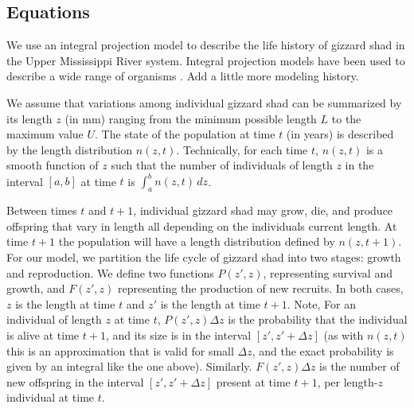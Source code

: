 \documentclass[11pt,oneside]{amsart}
\def\ds{\displaystyle}
\theoremstyle{definition}
\begin{document}
\subsection{Equations}
We use an integral projection model to describe the life history of gizzard shad in the Upper Mississippi River system.  Integral projection models have been used to describe a wide range of organisms \citep{ellner2016data, merow2014advancing, rees2014building}.  Add a little more modeling history.

We assume that variations among individual gizzard shad can be summarized by its length $z$ (in mm) ranging from the minimum possible length $L$ to the maximum value $U$.  The state of the population at time $t$ (in years) is described by the length distribution $n(z,t)$.  Technically, for each time $t$, $n(z,t)$ is a smooth function of $z$ such that the number of individuals of length $z$ in the interval $[a,b]$ at time $t$ is $\ds \int_a^b n(z,t) \, dz$. 

Between times $t$ and $t+1$, individual gizzard shad may grow, die, and produce offspring that vary in length all depending on the individuals current length. At time $t+1$ the population will have a length distribution defined by $n(z, t+1)$. For our model, we partition the life cycle of gizzard shad into two stages: growth and reproduction.  We define two functions $P(z',z)$, representing survival and growth, and $F(z',z)$ representing the production of new recruits.  In both cases, $z$ is the length at time $t$ and $z'$ is the length at time $t+1$.  Note, For an individual of length $z$ at time $t$, $P(z',z)\Delta z$ is the probability that the individual is alive at time $t+1$, and its size is in the interval $[z', z' + \Delta z]$ (as with $n(z,t)$ this is an approximation that is valid for small $\Delta z$, and the exact probability is given by an integral like the one above). Similarly. $F(z',z)\Delta z$ is the number of new offspring in the interval $[z', z' + \Delta z]$ present at time $t+1$, per length-$z$ individual at time $t$.
\end{document}

